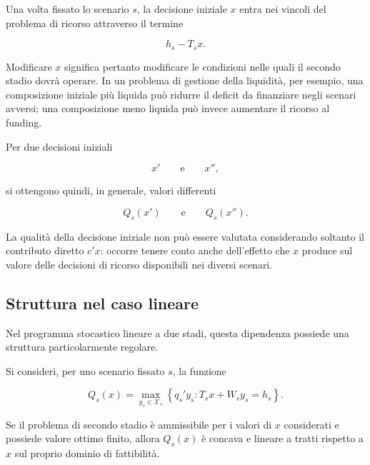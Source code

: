 Una volta fissato lo scenario $s$, la decisione iniziale $x$ entra nei vincoli
del problema di ricorso attraverso il termine

\[
h_s-T_sx.
\]

Modificare $x$ significa pertanto modificare le condizioni nelle quali il
secondo stadio dovr\`a operare. In un problema di gestione della liquidit\`a,
per esempio, una composizione iniziale pi\`u liquida pu\`o ridurre il deficit
da finanziare negli scenari avversi; una composizione meno liquida pu\`o
invece aumentare il ricorso al funding.

Per due decisioni iniziali

\[
x'
\qquad\text{e}\qquad
x'',
\]

\noindent si ottengono quindi, in generale, valori differenti

\[
Q_s(x')
\qquad\text{e}\qquad
Q_s(x'').
\]

La qualit\`a della decisione iniziale non pu\`o essere valutata considerando
soltanto il contributo diretto $c'x$: occorre tenere conto anche dell'effetto
che $x$ produce sul valore delle decisioni di ricorso disponibili nei diversi
scenari.

\subsection{Struttura nel caso lineare}

Nel programma stocastico lineare a due stadi, questa dipendenza possiede una
struttura particolarmente regolare.

\begin{proposition}

Si consideri, per uno scenario fissato $s$, la funzione

\[
Q_s(x)
=
\max_{y_s\in\mathcal X_s}
\left\{
q_s'y_s:
T_sx+W_sy_s=h_s
\right\}.
\]

Se il problema di secondo stadio \`e ammissibile per i valori di $x$
considerati e possiede valore ottimo finito, allora $Q_s(x)$ \`e concava e
lineare a tratti rispetto a $x$ sul proprio dominio di fattibilit\`a.

\end{proposition}

%
%



